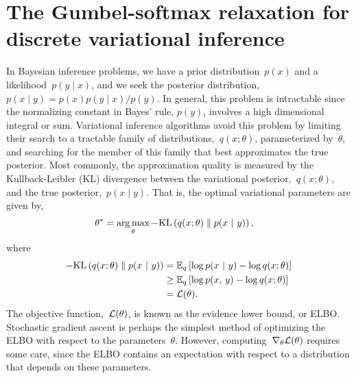\documentclass{article}
\begin{document}
\section{The Gumbel-softmax relaxation for discrete variational inference}
\label{sec:gumbel}

In Bayesian inference problems, we have a prior distribution~$p(x)$
and a likelihood~$p(y \mid x)$, and
we seek the posterior distribution,~${p(x \mid y) = p(x) p(y \mid x) / p(y)}$.
In general, this problem is intractable since the normalizing constant
in Bayes' rule, $p(y)$, involves a high dimensional integral or sum.
Variational inference algorithms avoid this problem by limiting their
search to a tractable family of distributions,~$q(x; \theta)$,
parameterized by~$\theta$, and searching for the member of this family
that best approximates the true posterior. Most commonly, the
approximation quality is measured by the Kullback-Leibler (KL)
divergence between the variational posterior,~$q(x; \theta)$, and the
true posterior,~$p(x \mid y)$. That is, the optimal variational
parameters are given by,
\begin{align}
  \theta^* &= \operatorname*{arg\,max}_\theta -\textrm{KL}\left(q(x; \theta)\;\|\;p(x ~\vert~ y)\right),
\end{align}
where
\begin{align}
  -\textrm{KL}\left(q(x; \theta)\;\|\;p(x ~\vert~ y)\right) 
  &= \mathbb{E}_{q}
  \left[ \log p(x ~\vert~ y) - \log q(x; \theta) \right] \\
  &\geq \mathbb{E}_{q}
  \left[ \log p(x, \, y) - \log q(x; \theta) \right] \\
  &= \mathcal{L}(\theta).
\end{align}
The objective function,~$\mathcal{L}(\theta)$, is known as the evidence lower bound, or ELBO.
Stochastic gradient ascent is
perhaps the simplest method of optimizing the ELBO with respect to
the parameters~$\theta$.
However, computing~$\nabla_\theta \mathcal{L}(\theta)$ requires some care,
since the ELBO contains an expectation with respect to a distribution
that depends on these parameters.
\end{document}
